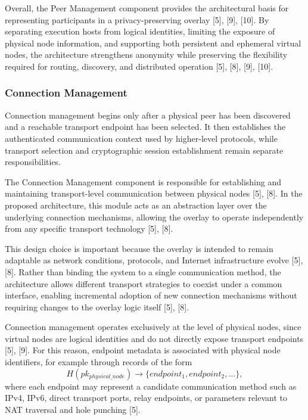 \documentclass[12pt,a4paper]{article}
\begin{document}
Overall, the Peer Management component provides the architectural basis for representing participants in a privacy-preserving overlay [5], [9], [10]. By separating execution hosts from logical identities, limiting the exposure of physical node information, and supporting both persistent and ephemeral virtual nodes, the architecture strengthens anonymity while preserving the flexibility required for routing, discovery, and distributed operation [5], [8], [9], [10].

\subsubsection{Connection Management}

Connection management begins only after a physical peer has been discovered and a reachable transport endpoint has been selected. It then establishes the authenticated communication context used by higher-level protocols, while transport selection and cryptographic session establishment remain separate responsibilities.

\thesisconnectiontikz

The Connection Management component is responsible for establishing and maintaining transport-level communication between physical nodes [5], [8]. In the proposed architecture, this module acts as an abstraction layer over the underlying connection mechanisms, allowing the overlay to operate independently from any specific transport technology [5], [8].

This design choice is important because the overlay is intended to remain adaptable as network conditions, protocols, and Internet infrastructure evolve [5], [8]. Rather than binding the system to a single communication method, the architecture allows different transport strategies to coexist under a common interface, enabling incremental adoption of new connection mechanisms without requiring changes to the overlay logic itself [5], [8].

Connection management operates exclusively at the level of physical nodes, since virtual nodes are logical identities and do not directly expose transport endpoints [5], [9]. For this reason, endpoint metadata is associated with physical node identifiers, for example through records of the form
\[
H(pk_{physical\_node}) \rightarrow \{endpoint_1, endpoint_2, \dots\},
\]
where each endpoint may represent a candidate communication method such as IPv4, IPv6, direct transport ports, relay endpoints, or parameters relevant to NAT traversal and hole punching [5].
\end{document}
